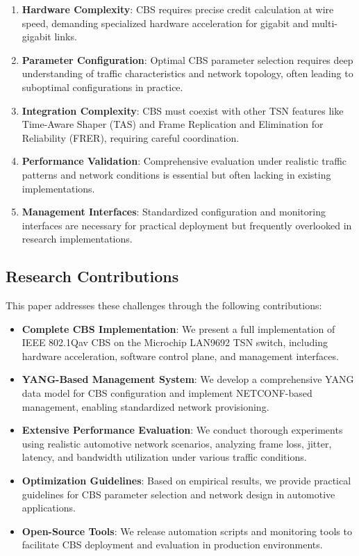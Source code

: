 \documentclass[10pt, journal, compsoc]{IEEEtran}
\begin{document}
\begin{enumerate}
    \item \textbf{Hardware Complexity}: CBS requires precise credit calculation at wire speed, demanding specialized hardware acceleration for gigabit and multi-gigabit links.
    
    \item \textbf{Parameter Configuration}: Optimal CBS parameter selection requires deep understanding of traffic characteristics and network topology, often leading to suboptimal configurations in practice.
    
    \item \textbf{Integration Complexity}: CBS must coexist with other TSN features like Time-Aware Shaper (TAS) and Frame Replication and Elimination for Reliability (FRER), requiring careful coordination.
    
    \item \textbf{Performance Validation}: Comprehensive evaluation under realistic traffic patterns and network conditions is essential but often lacking in existing implementations.
    
    \item \textbf{Management Interfaces}: Standardized configuration and monitoring interfaces are necessary for practical deployment but frequently overlooked in research implementations.
\end{enumerate}

\subsection{Research Contributions}

This paper addresses these challenges through the following contributions:

\begin{itemize}
    \item \textbf{Complete CBS Implementation}: We present a full implementation of IEEE 802.1Qav CBS on the Microchip LAN9692 TSN switch, including hardware acceleration, software control plane, and management interfaces.
    
    \item \textbf{YANG-Based Management System}: We develop a comprehensive YANG data model for CBS configuration and implement NETCONF-based management, enabling standardized network provisioning.
    
    \item \textbf{Extensive Performance Evaluation}: We conduct thorough experiments using realistic automotive network scenarios, analyzing frame loss, jitter, latency, and bandwidth utilization under various traffic conditions.
    
    \item \textbf{Optimization Guidelines}: Based on empirical results, we provide practical guidelines for CBS parameter selection and network design in automotive applications.
    
    \item \textbf{Open-Source Tools}: We release automation scripts and monitoring tools to facilitate CBS deployment and evaluation in production environments.
\end{itemize}
\end{document}
